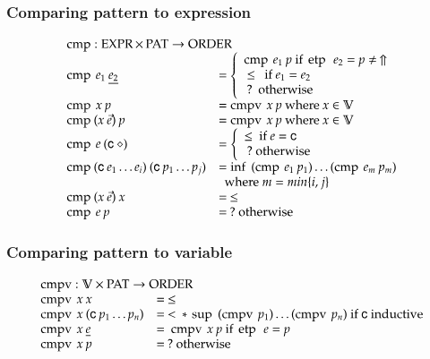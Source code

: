 \subsubsection{Comparing pattern to expression}
\[
\begin{array}[t]{ll}
\multicolumn{2}{l}{\cmp : \Expr \times \Pat \ra \order}\\ 
\cmp \: e_1 \: \inacc{e_2} & = \left\{ 
\begin{array}{l}
\cmp \: e_1 \: p \mbox{ if } \etp \: e_2 = p \neq \stuck \\
\: \leq \: \mbox{ if } e_1 = e_2 \\
\: ? \:    \mbox{ otherwise}
\end{array}\right.\\ 
\cmp \: x \: p & = \cmpv \: x \:p  \mbox{ where } x \in \cV \\
\cmp \: (x \: \vec{e}) \: p & = \cmpv \: x \:p  \mbox{ where } x \in \cV \\
\cmp \: e   \: (\cc \: \diamond) & = \left\{ \begin{array}{l} 
    \leq \mbox{ if  } e = \cc \\
    \: ? \mbox{ otherwise} 
  \end{array} \right.\\
\cmp \: (\cc \: e_1 \ldots e_i) \: (\cc \: p_1 \ldots p_j) & = \info \: (\cmp \: e_1 \: p_1) \ldots (\cmp \: e_m \: p_m)\\
& \: \mbox { where } m = min\{i,j\} \\ 
\cmp \: (x \: \vec{e}) \: x & = \: \leq \\
\cmp \: e \: p & = \: ? \mbox{ otherwise}
\end{array}
\]

\subsubsection{Comparing pattern to variable}
\[
\begin{array}[t]{ll}
\multicolumn{2}{l}{\cmpv : \cV \times \Pat \ra \order}\\ 
\cmpv \: x \: x & = \: \leq \\
\cmpv \: x \: (\cc \: p_1 \ldots p_n) & = \: < \: * \: \supo \: (\cmpv \: p_1) \ldots (\cmpv \: p_n) \mbox{ if } \cc \mbox{ inductive}\\
\cmpv \: x \: \inacc{e} & = \: \cmpv \: x \: p \mbox{ if } \etp \: e = p \\
\cmpv \: x \: p & = \: ? \mbox{ otherwise}
\end{array}
\]

